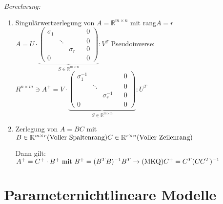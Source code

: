 \documentclass[ngerman]{tudscrreprt}
\begin{document}
\textit{Berechnung:}\\
\begin{enumerate}
\item Singulärwertzerlegung von $A=\mathbb{R}^{m\times n}$ mit rang${A} = r $ \\
$
A = U\cdot
\underbrace{
\begin{pmatrix}
\sigma_1 && && 0\\
         &\ddots& && 0\\
         &&\sigma_r&&0\\
         0&&&&0
\end{pmatrix}}_{S\in \mathbb{R}^{m\times n}}:V^T
$ Pseudoinverse:\\ $R^{n\times m} \ni A^+ = V 
\cdot
\underbrace{
\begin{pmatrix}
\sigma_1^{-1} && && 0\\
         &\ddots& && 0\\
         &&\sigma_r^{-1}&&0\\
         0&&&&0
\end{pmatrix}}_{S\in \mathbb{R}^{m\times n}}:U^T
$
\item Zerlegung von $A=BC$ mit \\
$B \in \mathbb{R}^{m\times r} \text{(Voller Spaltenrang)}\\
C \in \mathbb{R}^{r\times n} \text{(Voller Zeilenrang)}
$\\
\begin{figure}[H] 
	\centering 
	\def\svgwidth{200pt} 
	 
\end{figure} 

Dann gilt:\\ $
A^+ = C^+ \cdot B^+ \text{ mit }\\
B^+ = (B^T B)^{-1} B^T \rightarrow \text{(MKQ)}\\
C^+ = C^T (CC^T)^{-1}
$
\end{enumerate}
\newpage
\section{Parameternichtlineare Modelle}
\end{document}

